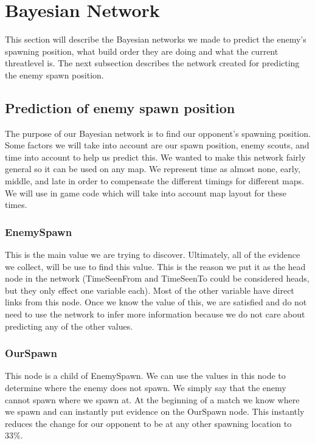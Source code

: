 \section{Bayesian Network}\label{bayesian_network}
This section will describe the Bayesian networks we made to predict the enemy's spawning position, what build order they are doing and what the current 
threatlevel is. The next subsection describes the network created for predicting the enemy spawn position.

\subsection{Prediction of enemy spawn position}			 
			
The purpose of our Bayesian network is to find our opponent's spawning position. Some factors we will take into account are our spawn position, enemy scouts, and time into account to help us predict this. We wanted to make this network fairly general so it can be used on any  map. We represent time as almost none, early, middle, and late in order to compensate the different timings for different maps. We will use in game code which will take into account map layout for these times. 

\subsubsection*{EnemySpawn}
This is the main value we are trying to discover. Ultimately, all of the evidence we collect, will be use to find this value. This is the reason we put it as the head node in the network (TimeSeenFrom and TimeSeenTo could be considered heads, but they only effect one variable each). Most of the other variable have direct links from this node. Once we know the value of this, we are satisfied and do not need to use the network to infer more information because we do not care about predicting any of the other values.

\subsubsection*{OurSpawn}
This node is a child of EnemySpawn. We can use the values in this node to determine where the enemy does not spawn. We simply say that the enemy cannot spawn where we spawn at. At the beginning of a match we know where we spawn and can instantly put evidence on the OurSpawn node. This instantly reduces the change for our opponent to be at any other spawning location to 33\%.

